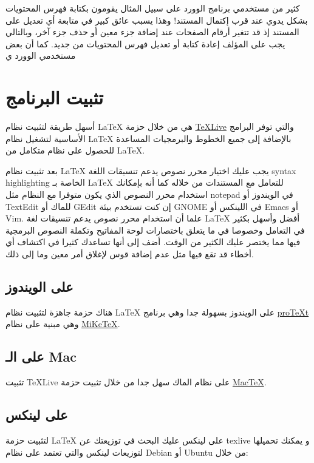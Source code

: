 \documentclass[12pt,a4paper,onecolumn,notitlepage]{book}
\begin{document}
\noindent كثير من مستخدمي برنامج الوورد على سبيل المثال يقومون بكتابة فهرس المحتويات بشكل يدوي عند قرب إكتمال المستند! وهذا يسبب عائق كبير في متابعة أي تعديل على المستند إذ قد تتغير أرقام الصفحات عند إضافة جزء معين أو حذف جزء آخر، وبالتالي يجب على المؤلف إعادة كتابة أو تعديل فهرس المحتويات من جديد. كما أن بعض مستخدمي الوورد ي

\section{تثبيت البرنامج}
أسهل طريقة لتثبيت نظام \textenglish{\LaTeX} هي من خلال حزمة \href{http://www.tug.org/texlive/}{\textenglish{\TeX Live}} والتي توفر البرامج الأساسية لتشغيل نظام \textenglish{\LaTeX} بالإضافة إلى جميع الخطوط والبرمجيات المساعدة للحصول على نظام  متكامل من \textenglish{\LaTeX}.

بعد تثبيت نظام \textenglish{\LaTeX} يجب عليك اختيار محرر نصوص يدعم تنسيقات اللغة \textenglish{syntax highlighting} الخاصة بـ \textenglish{\LaTeX} للتعامل مع المستندات من خلاله كما أنه بإمكانك استخدام محرر النصوص الذي يكون متوفرا مع النظام مثل \textenglish{notepad} في الويندوز أو \textenglish{TextEdit} للماك أو \textenglish{GEdit} إن كنت تستخدم بيئة \textenglish{GNOME} في اللينكس أو \textenglish{Emacs} أو \textenglish{Vim}. علما أن استخدام محرر نصوص يدعم تنسيقات لغة \textenglish{\LaTeX} أفضل وأسهل بكثير في التعامل وخصوصا في ما يتعلق باختصارات لوحة المفاتيح وتكملة النصوص البرمجية فيها مما يختصر عليك الكثير من الوقت. أضف إلى أنها تساعدك كثيرا في اكتشاف أي أخطاء قد تقع فيها مثل عدم إضافة قوس لإغلاق أمر معين وما إلى ذلك.

\subsection{على الويندوز}
هناك حزمة جاهزة لتثبيت نظام \textenglish{\LaTeX} على الويندوز بسهولة جدا وهي برنامج \href{http://tug.org/protext/}{\textenglish{pro\TeX t} } وهي مبنية على نظام  \href{http://miktex.org/download}{\textenglish{MiKe\TeX}}.

\subsection{على الـ \textenglish{Mac}}
تثبيت \textenglish{\TeX Live} على نظام الماك سهل جدا من خلال تثبيت حزمة \href{http://www.tug.org/mactex/}{\textenglish{Mac\TeX}}.

\subsection{على لينكس}
لتثبيت حزمة \textenglish{\LaTeX} على لينكس عليك البحث في توزيعتك عن \textenglish{texlive} و يمكنك تحميلها لتوزيعات لينكس والتي تعتمد على نظام \textenglish{Debian} أو \textenglish{Ubuntu} من خلال:
\end{document}
